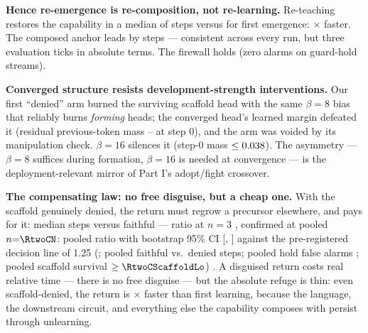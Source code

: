 \documentclass[11pt]{article}
\begin{document}
\textbf{Hence re-emergence is re-composition, not re-learning.} Re-teaching restores
the capability in a median of \RtwoFaithMed{} steps versus \PsevenTzero{} for first
emergence: \RtwoRelearnX$\times$ faster. The composed anchor leads by
\RtwoFaithLead{} steps --- consistent across every run, but three evaluation ticks
in absolute terms. The firewall holds (zero alarms on guard-hold streams).

\textbf{Converged structure resists development-strength interventions.} Our first
``denied'' arm burned the surviving scaffold head with the same $\beta{=}8$ bias
that reliably burns \emph{forming} heads; the converged head's learned margin
defeated it (residual previous-token mass \RtwoBurnFailLo--\RtwoBurnFailHi{} at
step 0), and the arm was voided by its manipulation check. $\beta{=}16$ silences it
(step-0 mass $\le0.038$). The asymmetry --- $\beta{=}8$ suffices during
formation, $\beta{=}16$ is needed at convergence --- is the deployment-relevant
mirror of Part I's adopt/fight crossover.

\textbf{The compensating law: no free disguise, but a cheap one.} With the scaffold
genuinely denied, the return must regrow a precursor elsewhere, and pays for it:
median \RtwoBDeniedMed{} steps versus \RtwoFaithMed{} faithful --- ratio
\RtwoBRatio{} at $n{=}3$%
\ifnum{}
, confirmed at pooled $n{=}\RtwoCN$: pooled ratio \RtwoCRatio{} with bootstrap 95\%
CI [\RtwoCCIlo, \RtwoCCIhi] against the pre-registered decision line of 1.25
(\RtwoCVerdict; pooled faithful \RtwoCFaithMed{} vs.\ denied \RtwoCDeniedMed{}
steps; pooled hold false alarms \RtwoCHoldFA; pooled scaffold survival
$\ge\RtwoCScaffoldLo$)%
\fi
. A disguised return costs real relative time --- there is no free disguise --- but
the absolute refuge is thin: even scaffold-denied, the return is
\RtwoBDeniedVsFirstX$\times$ faster than first learning, because the language, the
downstream circuit, and everything else the capability composes with persist through
unlearning.
\end{document}
